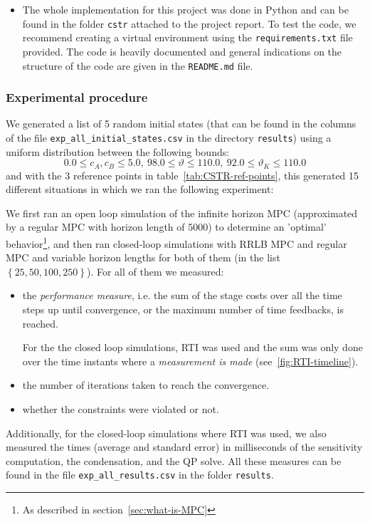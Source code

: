 \documentclass[12pt]{article}
\begin{document}
\begin{itemize}[label=\textbullet]
	\item The whole implementation for this project was done in Python and can be found in the folder \verb|cstr| attached to the project report.
	To test the code, we recommend creating a virtual environment using the \verb|requirements.txt| file provided.
	The code is heavily documented and general indications on the structure of the code are given in the \verb|README.md| file.
\end{itemize}

\subsubsection{Experimental procedure}

We generated a list of 5 random initial states (that can be found in the columns of the file \verb|exp_all_initial_states.csv| in the directory \verb|results|) using a uniform distribution between the following bounds:
$$0.0\leq c_A,c_B\leq 5.0,~98.0\leq\vartheta\leq 110.0,~92.0\leq \vartheta_K\leq 110.0$$
and with the 3 reference points in table~\ref{tab:CSTR-ref-points}, this generated 15 different situations in which we ran the following experiment:

We first ran an open loop simulation of the infinite horizon MPC (approximated by a regular MPC with horizon length of 5000) to determine an 'optimal' behavior\footnote{As described in section~\ref{sec:what-is-MPC}}, and then ran closed-loop simulations with RRLB MPC and regular MPC and variable horizon lengths for both of them (in the list $\left\{ 25, 50, 100, 250 \right\}$).
For all of them we measured:
\begin{itemize}[label=\textbullet]
	\item the \textit{performance measure}, i.e. the sum of the stage costs over all the time steps up until convergence, or the maximum number of time feedbacks, is reached.

	For the the closed loop simulations, RTI was used and the sum was only done over the time instants where a \textit{measurement is made} (see~\ref{fig:RTI-timeline}).

	\item the number of iterations taken to reach the convergence.

	\item whether the constraints were violated or not.
\end{itemize}

\noindent Additionally, for the closed-loop simulations where RTI was used, we also measured the times (average and standard error) in milliseconds of the sensitivity computation, the condensation, and the QP solve.
All these measures can be found in the file \verb|exp_all_results.csv| in the folder \verb|results|.
\end{document}

